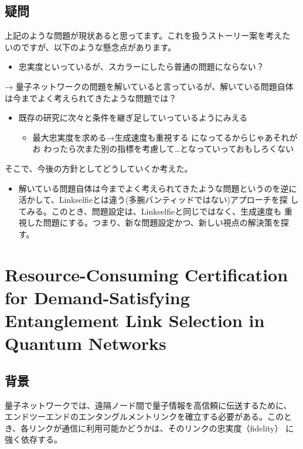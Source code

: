 \documentclass[conference]{IEEEtran}
\begin{document}
\subsection{疑問}
\label{sec:orgda0031e}
上記のような問題が現状あると思ってます。これを扱うストーリー案を考えた
いのですが、以下のような懸念点があります。

\begin{itemize}
\item 忠実度といっているが、スカラーにしたら普通の問題にならない？
\end{itemize}
→ 量子ネットワークの問題を解いていると言っているが、解いている問題自体
は今までよく考えられてきたような問題では？

\begin{itemize}
\item 既存の研究に次々と条件を継ぎ足していっているようにみえる
\begin{itemize}
\item 最大忠実度を求める→生成速度も重視する になってるからじゃあそれがお
わったら次また別の指標を考慮して\ldots{}となっていっておもしろくない
\end{itemize}
\end{itemize}


そこで、今後の方針としてどうしていくか考えた。
\begin{itemize}
\item 解いている問題自体は今までよく考えられてきたような問題というのを逆に
活かして、Linkselfieとは違う(多腕バンティッドではない)アプローチを探
してみる。このとき、問題設定は、Linkselfieと同じではなく、生成速度も
重視した問題にする。つまり、新な問題設定かつ、新しい視点の解決策を探
す。
\end{itemize}


\section{Resource-Consuming Certification for Demand-Satisfying Entanglement Link Selection in Quantum Networks}
\label{sec:org5d5d0ef}


\subsection{背景}
\label{sec:org37739d2}

量子ネットワークでは、遠隔ノード間で量子情報を高信頼に伝送するために、
エンドツーエンドのエンタングルメントリンクを確立する必要がある。このと
き、各リンクが通信に利用可能かどうかは、そのリンクの忠実度（fidelity）
に強く依存する。
\end{document}
